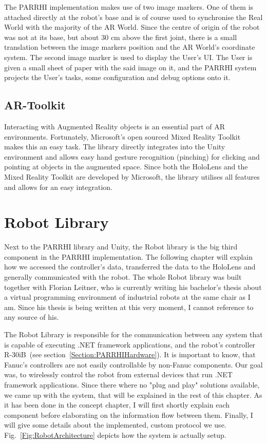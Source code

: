 The PARRHI implementation makes use of two image markers. One of them is attached directly at the robot's base and is of course used to synchronise the Real World with the majority of the AR World. Since the centre of origin of the robot was not at its base, but about 30 cm above the first joint, there is a small translation between the image markers position and the AR World's coordinate system. The second image marker is used to display the User's UI. The User is given a small sheet of paper with the said image on it, and the PARRHI system projects the User's tasks, some configuration and debug options onto it.


\subsection{AR-Toolkit}
Interacting with Augmented Reality objects is an essential part of AR environments. Fortunately, Microsoft's open sourced Mixed Reality Toolkit~\cite{MicrosoftMRToolkit} makes this an easy task. The library directly integrates into the Unity environment and allows easy hand gesture recognition (pinching) for clicking and pointing at objects in the augmented space. Since both the HoloLens and the Mixed Reality Toolkit are developed by Microsoft, the library utilises all features and allows for an easy integration.


\section{Robot Library}\label{Section:RobotLibrary}
Next to the PARRHI library and Unity, the Robot library is the big third component in the PARRHI implementation. The following chapter will explain how we accessed the controller's data, transferred the data to the HoloLens and generally communicated with the robot. The whole Robot library was built together with Florian Leitner, who is currently writing his bachelor's thesis about a virtual programming environment of industrial robots at the same chair as I am. Since his thesis is being written at this very moment, I cannot reference to any source of his.

The Robot Library is responsible for the communication between any system that is capable of executing .NET framework applications, and the robot's controller R-30iB~(see section~\ref{Section:PARRHIHardware}). It is important to know, that Fanuc's controllers are not easily controllable by non-Fanuc components. Our goal was, to wirelessly control the robot from external devices that run .NET framework applications. Since there where no "plug and play" solutions available, we came up with the system, that will be explained in the rest of this chapter. As it has been done in the concept chapter, I will first shortly explain each component before elaborating on the information flow between them. Finally, I will give some details about the implemented, custom protocol we use. Fig.~\ref{Fig:RobotArchitecture} depicts how the system is actually setup.

